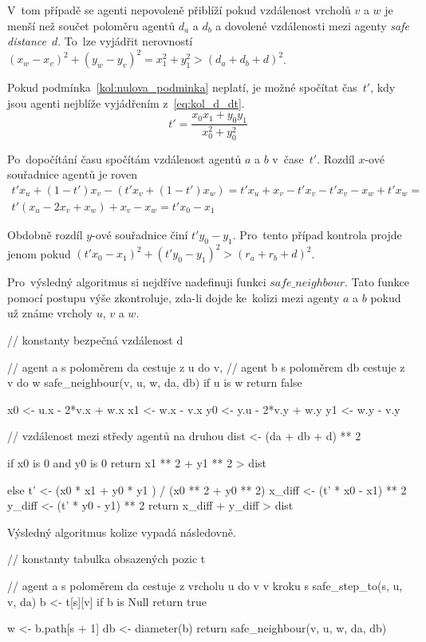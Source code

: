 V~tom případě se agenti nepovoleně přiblíží pokud vzdálenost vrcholů $v$ a $w$ je menší než
součet poloměru agentů $d_a$ a $d_b$ a dovolené vzdálenosti mezi agenty \emph{safe distance}~$d$.
To~lze vyjádřit nerovností $(x_w - x_v)^2 + (y_w - y_v)^2 = x_1^2 + y_1^2 > (d_a + d_b + d)^2$.


Pokud podmínka~\ref{kol:nulova_podminka} neplatí, je možné spočítat čas~$t'$, kdy jsou agenti nejblíže vyjádřením z~\ref{eq:kol_d_dt}.
\begin{equation}
  \label{eq:kol_t}
  t' = \frac{x_0 x_1 + y_0 y_1}{x_0^2 + y_0^2}
\end{equation}

Po~dopočítání času spočítám vzdálenost agentů $a$ a $b$ v~čase~$t'$.
Rozdíl $x$-ové souřadnice agentů je roven
\begin{gather*}
  t' x_u + (1 - t')x_v - (t' x_v + (1 - t')x_w) =
  t' x_u + x_v - t' x_v - t' x_v - x_w + t' x_w = \\
  t'(x_u - 2x_v + x_w) + x_v - x_w =
  t' x_0 - x_1
\end{gather*}

Obdobně rozdíl $y$-ové souřadnice činí $t' y_0 - y_1$.
Pro~tento případ kontrola projde jenom pokud $(t' x_0 - x_1)^2 + (t' y_0 - y_1)^2 > (r_a + r_b + d)^2$.

Pro~výsledný algoritmus si nejdříve nadefinuji funkci $safe\_neighbour$.
Tato funkce pomocí postupu výše zkontroluje, zda-li dojde ke~kolizi mezi agenty $a$ a $b$
pokud už známe vrcholy $u$, $v$ a $w$.
\begin{code}
// konstanty bezpečná vzdálenost d

// agent a s poloměrem da cestuje z u do v,
// agent b s poloměrem db cestuje z v do w
safe_neighbour(v, u, w, da, db)
  if u is w return false

  x0 <- u.x - 2*v.x + w.x
  x1 <- w.x - v.x
  y0 <- y.u - 2*v.y + w.y
  y1 <- w.y - v.y

  // vzdálenost mezi středy agentů na druhou
  dist <- (da + db + d) ** 2

  if x0 is 0 and y0 is 0
    return x1 ** 2 + y1 ** 2 > dist

  else
    t' <- (x0 * x1 + y0 * y1 ) / (x0 ** 2 + y0 ** 2)
    x_diff <- (t' * x0 - x1) ** 2
    y_diff <- (t' * y0 - y1) ** 2
    return x_diff + y_diff > dist
\end{code}
\label{alg:check_neighbour}

Výsledný algoritmus kolize vypadá následovně.
\begin{code}
// konstanty tabulka obsazených pozic t

// agent a s poloměrem da cestuje z vrcholu u do v v kroku s
safe_step_to(s, u, v, da)
  b <- t[s][v]
  if b is Null return true

  w <- b.path[s + 1]
  db <- diameter(b)
  return safe_neighbour(v, u, w, da, db)
\end{code}

